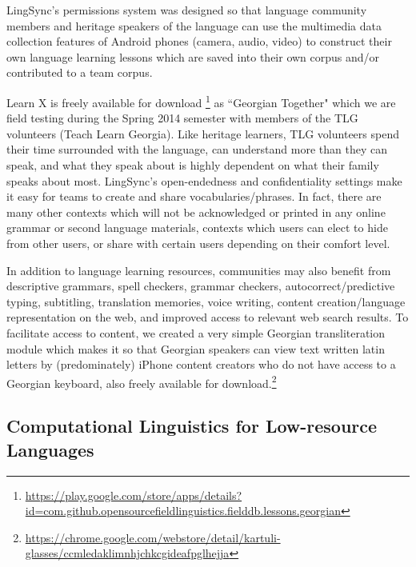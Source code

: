 \documentclass[11pt]{article}
\begin{document}
LingSync's permissions system was designed so that language community members
and heritage speakers of the language can use the multimedia data collection
features of Android phones (camera, audio, video) to construct their own
language learning lessons which are saved into their own corpus and/or
contributed to a team corpus.

Learn X is freely available for download%
\footnote{\url{https://play.google.com/store/apps/details?id=com.github.opensourcefieldlinguistics.fielddb.lessons.georgian}} %
 as ``Georgian Together" which we are field testing during the Spring 2014 semester with members of the TLG volunteers (Teach Learn Georgia).
Like heritage learners, TLG volunteers spend their time surrounded with the
language, can understand more than they can speak, and what they speak about is
highly dependent on what their family speaks about most. LingSync's
open-endedness and confidentiality settings make it easy for teams to create
and share vocabularies/phrases.
In fact, there are many other contexts which will not be acknowledged or printed
in any online grammar or second language materials, contexts which users can
elect to hide from other users, or share with certain users depending on their
comfort level.

In addition to language learning resources, communities may also benefit from
descriptive grammars, spell checkers, grammar checkers, autocorrect/predictive
typing, subtitling, translation memories, voice writing, content
creation/language representation on the web, and improved access to relevant
web search results. To facilitate access to content, we created a very simple
Georgian transliteration module which makes it so that Georgian speakers can
view text written latin letters by (predominately) iPhone content creators who
do not have access to a Georgian keyboard, also freely available for
download.\footnote{\url{https://chrome.google.com/webstore/detail/kartuli-glasses/ccmledaklimnhjchkcgideafpglhejja}}


\subsection{Computational Linguistics for Low-resource Languages}
\end{document}

